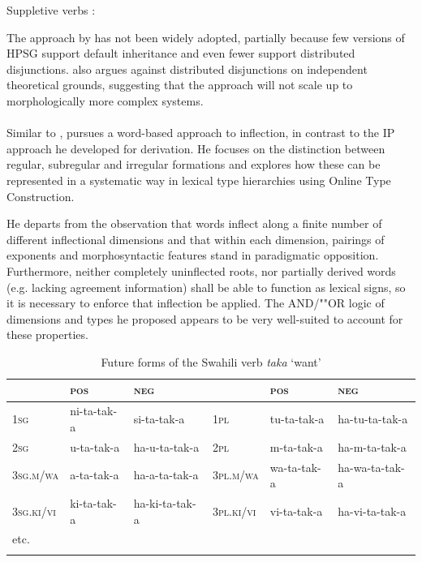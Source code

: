 \documentclass[output=paper
	        ,collection
	        ,collectionchapter
 	        ,biblatex
                ,babelshorthands
                ,newtxmath
                ,draftmode
                ,colorlinks, citecolor=brown
]{langscibook}
\begin{document}
\ea
\label{ex-DistrDisjSupp}
Suppletive verbs \citep[106]{Krieger:Nerbonne:93}:\\
\z

The approach by \citet{Krieger:Nerbonne:93} has not been widely
adopted, partially because few versions of HPSG support default
inheritance and even fewer support distributed
disjunctions. \citet[176--178]{Koenig99} also argues against distributed
disjunctions on independent theoretical grounds, suggesting that the
approach will not scale up to morphologically more complex systems.  

\paragraph*{\citet{Koenig99}}

Similar to \citet{Krieger:Nerbonne:93}, \citet{Koenig99} pursues a
word-based approach to inflection, in contrast to the IP approach he
developed for derivation. He focuses on the distinction between
regular, subregular and irregular formations and explores how these
can be represented in a systematic way in lexical type hierarchies
using Online Type Construction.

He departs from the observation that words  inflect along a finite number
of different inflectional dimensions and that within each dimension,
pairings of exponents and morphosyntactic features stand in
paradigmatic opposition. Furthermore, neither completely uninflected
roots, nor partially derived words (e.g. lacking agreement
information) shall be able to function as lexical signs, so it is
necessary to enforce that inflection be applied. The AND/""OR
logic of dimensions and types he proposed appears to be very
well-suited to account for these properties. 

\begin{table}
\setlength{\tabcolsep}{.3em}
\centering
\begin{tabular}{llllll}
\lsptoprule 
 & \textsc{pos} & \textsc{neg}     &             & \textsc{pos} & \textsc{neg}\\
\midrule 
\textsc{1sg}       & ni-{ta}-tak-{a} & {si}-{ta}-tak-{a}    & \textsc{1pl} & tu-{ta}-tak-{a}     & {ha}-tu-{ta}-tak-{a}\\
\textsc{2sg}       & u-{ta}-tak-{a}  & {ha}-u-{ta}-tak-{a}  & \textsc{2pl} & m-{ta}-tak-{a}      & {ha}-m-{ta}-tak-{a}\\
\textsc{3sg.m/wa}  & a-{ta}-tak-{a}  & {ha}-a-{ta}-tak-{a}  & \textsc{3pl.m/wa} & wa-{ta}-tak-{a} & {ha}-wa-{ta}-tak-{a}\\ 
\textsc{3sg.ki/vi} & ki-{ta}-tak-{a} & {ha}-ki-{ta}-tak-{a} & \textsc{3pl.ki/vi} & vi-{ta}-tak-{a} & {ha}-vi-{ta}-tak-{a}\\
etc. & &\\
\lspbottomrule
\end{tabular}
\caption{Future forms of the Swahili verb  \textit{taka} ‘want’}
\label{tab:SwahiliPast}
\end{table}
\end{document}
